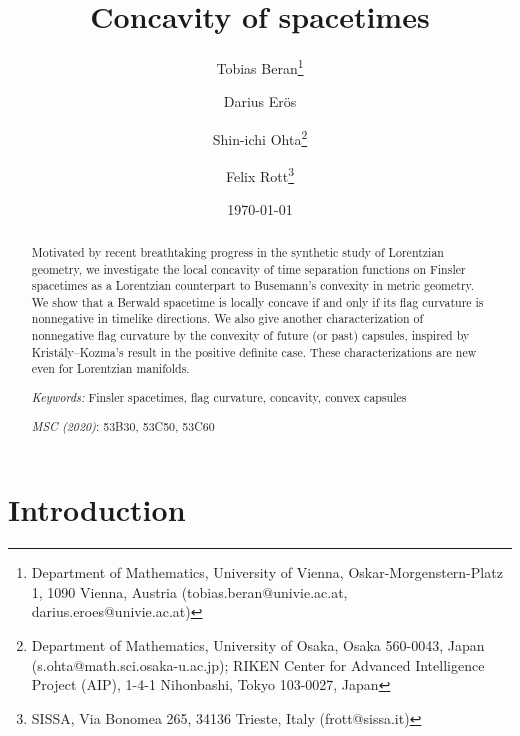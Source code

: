 \documentclass[a4paper,11pt]{article}
\numberwithin{equation}{section}
\theoremstyle{definition}
\theoremstyle{plain}
\begin{document}
\title{Concavity of spacetimes}
\date{\today}
\author{Tobias Beran\thanks{Department of Mathematics, University of Vienna, Oskar-Morgenstern-Platz 1, 1090 Vienna, Austria ({\sf tobias.beran@univie.ac.at}, {\sf darius.eroes@univie.ac.at})}
\and Darius Er\"os\footnotemark[1]
\and Shin-ichi Ohta\thanks{
Department of Mathematics, University of Osaka, Osaka 560-0043, Japan
({\sf s.ohta@math.sci.osaka-u.ac.jp});
RIKEN Center for Advanced Intelligence Project (AIP),
1-4-1 Nihonbashi, Tokyo 103-0027, Japan}
\and Felix Rott\thanks{SISSA, Via Bonomea 265, 34136 Trieste, Italy ({\sf frott@sissa.it})}
}

\maketitle

\begin{abstract}
Motivated by recent breathtaking progress in the synthetic study of Lorentzian geometry,
we investigate the local concavity of time separation functions on Finsler spacetimes as a Lorentzian counterpart to Busemann's convexity in metric geometry.
We show that a Berwald spacetime is locally concave if and only if its flag curvature is nonnegative in timelike directions.
We also give another characterization of nonnegative flag curvature by the convexity of future (or past) capsules, inspired by Krist\'aly--Kozma's result in the positive definite case.
These characterizations are new even for Lorentzian manifolds.
\medskip

\noindent
\emph{Keywords:} Finsler spacetimes, flag curvature, concavity, convex capsules
\medskip

\noindent
\emph{MSC (2020)}: 53B30, 53C50, 53C60
\end{abstract}

\section{Introduction}%
\end{document}
